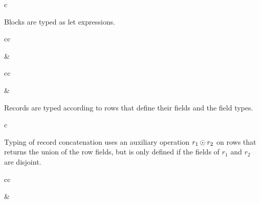 \documentclass[11pt]{article}
\begin{document}
\begin{rules}{c}


\end{rules}

Blocks are typed as let expressions.

\begin{rules}{cc}


&


\end{rules}

\begin{rules}{cc}


&


\end{rules}

Records are typed according to rows that define their fields and the field types.

\begin{rules}{c}


\end{rules}

Typing of record concatenation uses an auxiliary operation $r_1 \odot r_2$ on rows that returns the union of the row fields, but is only defined if the fields of $r_1$ and $r_2$ are disjoint.

\begin{rules}{cc}


&


\end{rules}
\end{document}
